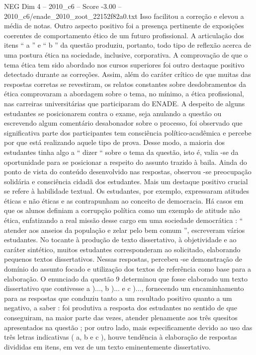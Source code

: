 \begin{textsample}{NEG Dim 4 – 2010\_c6 – Score -3.00 – 2010\_c6/enade\_2010\_zoot\_22152f82a0.txt}
Isso facilitou a correção e elevou a média de notas.
Outro aspecto positivo foi a presença pertinente de exposições coerentes de comportamento ético de um futuro profissional.
A articulação dos itens “ a ” e “ b ” da questão produziu, portanto, todo tipo de reflexão acerca de uma postura ética na sociedade, inclusive, corporativa.
A comprovação de que o tema ética tem sido abordado nos cursos superiores foi outro destaque positivo detectado durante as correções.
Assim, além do caráter crítico de que muitas das respostas corretas se revestiram, os relatos constantes sobre desdobramentos da ética comprovaram a abordagem sobre o tema, no mínimo, a ética profissional, nas carreiras universitárias que participaram do ENADE.
A despeito de alguns estudantes se posicionarem contra o exame, seja anulando a questão ou escrevendo algum comentário desabonador sobre o processo, foi observado que significativa parte dos participantes tem consciência político-acadêmica e percebe por que está realizando aquele tipo de prova.
Desse modo, a maioria dos estudantes tinha algo a “ dizer “ sobre o tema da questão, isto é, valia -se da oportunidade para se posicionar a respeito do assunto trazido à baila.
Ainda do ponto de vista do conteúdo desenvolvido nas respostas, observou -se preocupação solidária e consciência cidadã dos estudantes.
Mais um destaque positivo crucial se refere à habilidade textual.
Os estudantes, por exemplo, expressaram atitudes éticas e não éticas e as contrapunham ao conceito de democracia.
Há casos em que os alunos definiam a corrupção política como um exemplo de atitude não ética, enfatizando a real missão desse cargo em uma sociedade democrática : “ atender aos anseios da população e zelar pelo bem comum ”, escreveram vários estudantes.
No tocante à produção de texto dissertativo, à objetividade e ao caráter sintético, muitos estudantes corresponderam ao solicitado, elaborando pequenos textos dissertativos.
Nessas respostas, percebeu -se demonstração de domínio do assunto focado e utilização dos textos de referência como base para a elaboração.
O enunciado da questão 9 determinou que fosse elaborado um texto dissertativo que contivesse a )..., b )... e c )..., fornecendo um encaminhamento para as respostas que conduziu tanto a um resultado positivo quanto a um negativo, a saber : foi produtiva a resposta dos estudantes no sentido de que conseguiram, na maior parte das vezes, atender plenamente aos três quesitos apresentados na questão ; por outro lado, mais especificamente devido ao uso das três letras indicativas ( a, b e c ), houve tendência à elaboração de respostas divididas em itens, em vez de um texto eminentemente dissertativo.

\end{textsample}
